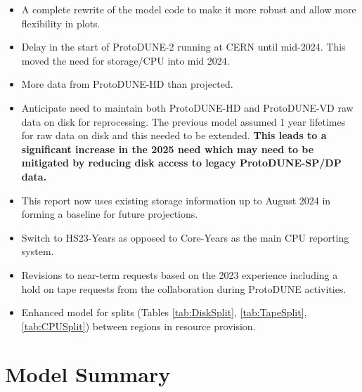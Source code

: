 \documentclass[12pt]{article}
\begin{document}
\begin{itemize}
\item A complete rewrite of the model code to make it more robust and allow more flexibility in plots. 
\item Delay in the start of ProtoDUNE-2 running at CERN until mid-2024. This moved the need for storage/CPU into mid 2024.  
\item More data from ProtoDUNE-HD than projected.  
\item Anticipate need to maintain both ProtoDUNE-HD and ProtoDUNE-VD raw data on disk for reprocessing.  The previous model assumed 1 year lifetimes for raw data on disk and this needed to be extended.  {\bf This leads to a significant increase in the 2025 need which may need to be mitigated by reducing disk access to legacy ProtoDUNE-SP/DP data. }
\item This report now uses existing storage information up to August 2024 in forming a baseline for future projections. 
\item Switch to HS23-Years as opposed to Core-Years as the main CPU reporting system.
\item Revisions to near-term requests based on the 2023 experience including a hold on tape requests from the collaboration during ProtoDUNE activities. 
\item Enhanced model for splits (Tables \ref{tab:DiskSplit}, \ref{tab:TapeSplit}, \ref{tab:CPUSplit}) between regions in resource provision. 
\end{itemize}

\section{Model Summary}
\end{document}
